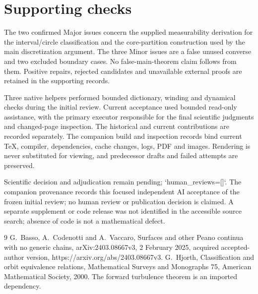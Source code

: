\documentclass[10pt]{article}
\begin{document}
\section*{Supporting checks}
The two confirmed Major issues concern the supplied measurability derivation for the interval/circle classification and the core-partition construction used by the main discretization argument. The three Minor issues are a false unused converse and two excluded boundary cases. No false-main-theorem claim follows from them. Positive repairs, rejected candidates and unavailable external proofs are retained in the supporting records.\par
Three native helpers performed bounded dictionary, winding and dynamical checks during the initial review. Current acceptance used bounded read-only assistance, with the primary executor responsible for the final scientific judgments and changed-page inspection. The historical and current contributions are recorded separately. The companion build and inspection records bind current TeX, compiler, dependencies, cache changes, logs, PDF and images. Rendering is never substituted for viewing, and predecessor drafts and failed attempts are preserved.\par
Scientific decision and adjudication remain pending; `human\_reviews=[]`. The companion provenance records this focused independent AI acceptance of the frozen initial review; no human review or publication decision is claimed. A separate supplement or code release was not identified in the accessible source search; absence of code is not a mathematical defect.\par
9 G. Basso, A. Codenotti and A. Vaccaro, Surfaces and other Peano continua with no generic chains, arXiv:2403.08667v3, 2 February 2025, acquired accepted-author version, https://arxiv.org/abs/2403.08667v3. G. Hjorth, Classification and orbit equivalence relations, Mathematical Surveys and Monographs 75, American Mathematical Society, 2000. The forward turbulence theorem is an imported dependency.\par
\end{document}
